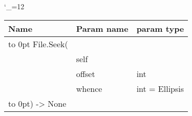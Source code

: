 \begingroup \catcode`\_=12 \tt
\begin{tabular}{lll}
\toprule
\textrm{Name}&\textrm{Param name}&\textrm{param type}\\
\midrule
\hbox to 0pt {File.Seek(\hss}\\
& self\\
& offset & int\\
& whence & int = Ellipsis\\
\hbox to 0pt{) -> None\hss}\\
\bottomrule
\end{tabular}
\endgroup
